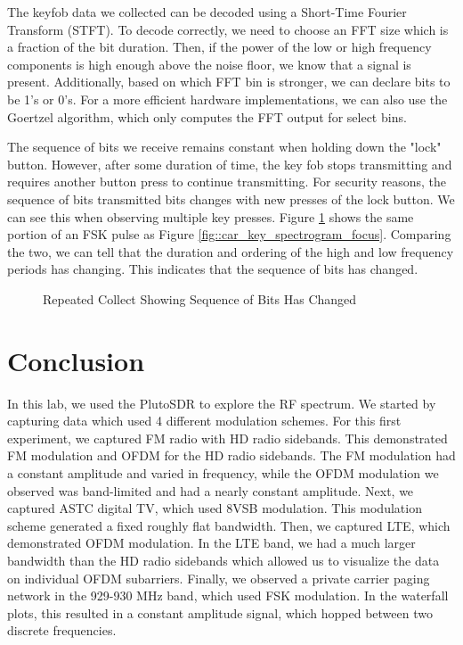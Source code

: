 \documentclass{article}
\begin{document}
The keyfob data we collected can be decoded using a Short-Time Fourier Transform (STFT). To decode correctly, we need to choose an FFT size which is a fraction of the bit duration. Then, if the power of the low or high frequency components is high enough above the noise floor, we know that a signal is present. Additionally, based on which FFT bin is stronger, we can declare bits to be 1's or 0's. For a more efficient hardware implementations, we can also use the Goertzel algorithm, which only computes the FFT output for select bins. 

The sequence of bits we receive remains constant when holding down the "lock" button. However, after some duration of time, the key fob stops transmitting and requires another button press to continue transmitting. For security reasons, the sequence of bits transmitted bits changes with new presses of the lock button. We can see this when observing multiple key presses. Figure \ref{fig::car_key_spectrogram_repeat} shows the same portion of an FSK pulse as Figure \ref{fig::car_key_spectrogram_focus}. Comparing the two, we can tell that the duration and ordering of the high and low frequency periods has changing. This indicates that the sequence of bits has changed.

\begin{figure}[H]
	\centerline{}
	\caption{Repeated Collect Showing Sequence of Bits Has Changed}
	\label{fig::car_key_spectrogram_repeat}
\end{figure}
 
\section{Conclusion}

In this lab, we used the PlutoSDR to explore the RF spectrum. We started by capturing data which used 4 different modulation schemes. For this first experiment, we captured FM radio with HD radio sidebands. This demonstrated FM modulation and OFDM for the HD radio sidebands. The FM modulation had a constant amplitude and varied in frequency, while the OFDM modulation we observed was band-limited and had a nearly constant amplitude. Next, we captured ASTC digital TV, which used 8VSB modulation. This modulation scheme generated a fixed roughly flat bandwidth. Then, we captured LTE, which demonstrated OFDM modulation. In the LTE band, we had a much larger bandwidth than the HD radio sidebands which allowed us to visualize the data on individual OFDM subarriers. Finally, we observed a private carrier paging network in the 929-930 MHz band, which used FSK modulation. In the waterfall plots, this resulted in a constant amplitude signal, which hopped between two discrete frequencies.
\end{document}
